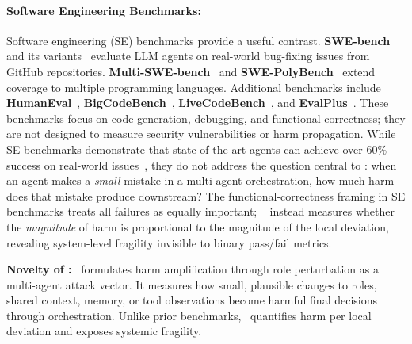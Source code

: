 \paragraph{Software Engineering Benchmarks:}
Software engineering (SE) benchmarks provide a useful contrast. \textbf{SWE-bench}~\cite{jimenez2024swebench} and its variants~\cite{yang2024sweagent} evaluate LLM agents on real-world bug-fixing issues from GitHub repositories. \textbf{Multi-SWE-bench}~\cite{zan2026multiswebench} and \textbf{SWE-PolyBench}~\cite{rashid2025swe} extend coverage to multiple programming languages. Additional benchmarks include \textbf{HumanEval}~\cite{chen2021evaluating}, \textbf{BigCodeBench}~\cite{zhuo2025bigcodebench}, \textbf{LiveCodeBench}~\cite{jain2025livecodebench}, and \textbf{EvalPlus}~\cite{liu2023is}. These benchmarks focus on code generation, debugging, and functional correctness; they are not designed to measure security vulnerabilities or harm propagation. While SE benchmarks demonstrate that state-of-the-art agents can achieve over 60\% success on real-world issues~\cite{anthropic2025claude37}, they do not address the question central to \proposed: when an agent makes a \textit{small} mistake in a multi-agent orchestration, how much harm does that mistake produce downstream? The functional-correctness framing in SE benchmarks treats all failures as equally important; \proposed~ instead measures whether the \textit{magnitude} of harm is proportional to the magnitude of the local deviation, revealing system-level fragility invisible to binary pass/fail metrics.

\noindent\textbf{Novelty of \proposed:}
\proposed~formulates harm amplification through role perturbation as a multi-agent attack vector. It measures how small, plausible changes to roles, shared context, memory, or tool observations become harmful final decisions through orchestration. Unlike prior benchmarks, \proposed~quantifies harm per local deviation and exposes systemic fragility.
